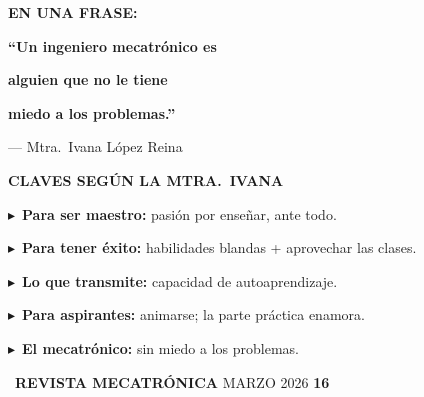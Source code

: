 \documentclass[10pt]{article}
\newcommand{\lineaGrisH}{%
  \noindent{\color{lineaGris}\rule{\linewidth}{0.4pt}}\par}
\newcommand{\itemCR}[1]{%
  \vspace{2pt}\noindent
  \textcolor{rose}{\small$\blacktriangleright$}\,%
  {\footnotesize\color{grisTexto}#1}\par}
\newcommand{\pieRevista}[2]{%
  \vspace*{\fill}\vspace{3pt}%
  \lineaGrisH\vspace{3pt}%
  {\footnotesize%
    \colorbox{azulOscuro}{\textcolor{blanco}{\footnotesize\textbf{\quad[R]\quad}}}\,%
    \textcolor{blanco}{\textbf{REVISTA MECATR\'ONICA}}\hfill
    \textcolor{grisTexto}{MARZO 2026\quad}%
    \textcolor{#1}{\textbf{#2}}}}
\begin{document}
\begin{minipage}{\dimexpr\paperwidth-1.7cm}
\noindent
\begin{minipage}[t]{0.54\linewidth}
\vspace{0pt}
\begin{tcolorbox}[colback=roseFondo, colframe=rose,
  arc=0pt, boxrule=1.5pt,
  left=10pt, right=10pt, top=8pt, bottom=8pt]
\centering
{\fontsize{7}{8.5}\selectfont\bfseries\color{rose}EN UNA FRASE:}\par
\vspace{5pt}
{\fontsize{13}{16}\selectfont\bfseries\color{blanco}
  ``Un ingeniero mecatr\'onico es}\par
{\fontsize{13}{16}\selectfont\bfseries\color{rose}
  alguien que no le tiene}\par
{\fontsize{13}{16}\selectfont\bfseries\color{blanco}
  miedo a los problemas.''}\par
\vspace{5pt}
{\fontsize{7}{8}\selectfont\color{grisTexto}
  --- Mtra.\ Ivana L\'opez Reina}
\end{tcolorbox}
\end{minipage}%
\hfill
\begin{minipage}[t]{0.43\linewidth}
\vspace{0pt}
\begin{tcolorbox}[colback=grisClaro, colframe=naranja,
  arc=0pt, boxrule=0.8pt, left=7pt, right=7pt, top=5pt, bottom=5pt]
{\fontsize{7.5}{9}\selectfont\bfseries\color{naranja}
  CLAVES SEG\'UN LA MTRA.\ IVANA}\par
\vspace{2pt}{\color{naranja}\rule{\linewidth}{0.4pt}}\par\vspace{3pt}
\itemCR{\textbf{Para ser maestro:} pasi\'on por ense\~nar, ante todo.}
\itemCR{\textbf{Para tener \'exito:} habilidades blandas + aprovechar las clases.}
\itemCR{\textbf{Lo que transmite:} capacidad de autoaprendizaje.}
\itemCR{\textbf{Para aspirantes:} animarse; la parte pr\'actica enamora.}
\itemCR{\textbf{El mecatr\'onico:} sin miedo a los problemas.}
\end{tcolorbox}
\end{minipage}
 
\pieRevista{rose}{16}
\vspace*{0.38cm}
\end{minipage}
 
\clearpage
\restoregeometry
\pagestyle{fancy}
\end{document}
